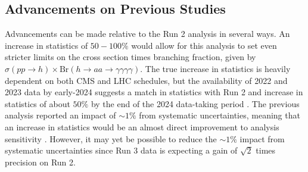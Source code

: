 \documentclass[12pt]{article}
\begin{document}
\subsection{Advancements on Previous Studies}
Advancements can be made relative to the Run 2 analysis in several ways. An increase in statistics of $50-100\%$ would allow for this analysis to set even stricter limits on the cross section times branching fraction, given by $\sigma(pp \rightarrow h) \times \mathrm{Br}(h\rightarrow aa \rightarrow \gamma\gamma\gamma\gamma)$. The true increase in statistics is heavily dependent on both CMS and LHC schedules, but the availability of 2022 and 2023 data by early-2024 suggests a match in statistics with Run 2 and increase in statistics of about $50\%$ by the end of the 2024 data-taking period \cite{PC_CMS_Week}. The previous analysis reported an impact of ${\sim}1\%$ from systematic uncertainties, meaning that an increase in statistics would be an almost direct improvement to analysis sensitivity \cite{Run2_analysis}. However, it may yet be possible to reduce the ${\sim}1\%$ impact from systematic uncertainties since Run 3 data is expecting a gain of $\sqrt{2}$ times precision on Run 2.\par

\end{document}
